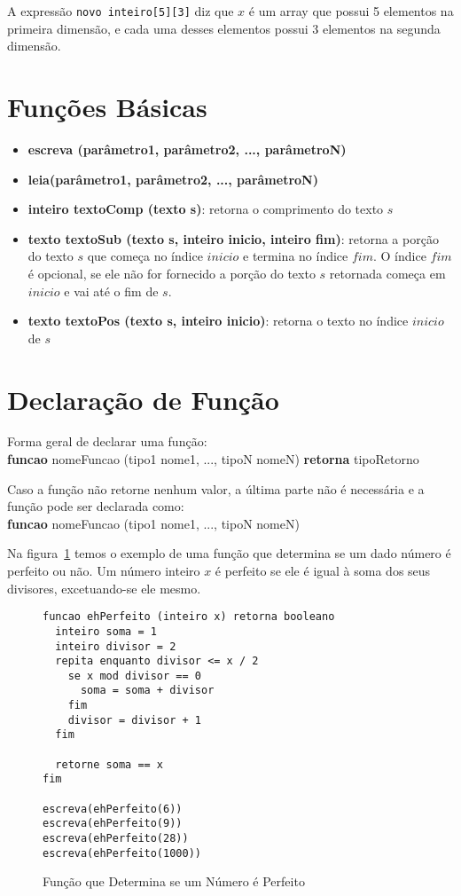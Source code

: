 \documentclass{report}
\begin{document}
A expressão \texttt{novo inteiro[5][3]} diz que $x$ é um
array que possui 5 elementos na primeira dimensão, e cada
uma desses elementos possui 3 elementos na segunda dimensão.


\section{Funções Básicas}

\begin{itemize}
	\item \textbf{escreva (parâmetro1, parâmetro2, ..., parâmetroN)}
	
	\item \textbf{leia(parâmetro1, parâmetro2, ..., parâmetroN)}
	
	\item \textbf{inteiro textoComp (texto s)}: retorna o comprimento do texto $s$
	
	\item \textbf{texto textoSub (texto s, inteiro inicio, inteiro fim)}:
	retorna a porção do texto $s$ que começa no índice $inicio$ e termina
  no índice $fim$. O índice $fim$ é opcional, se ele não for fornecido a
  porção do texto $s$ retornada começa em $inicio$ e vai até o fim de $s$.
	
	\item \textbf{texto textoPos (texto s, inteiro inicio)}:
	retorna o texto no índice $inicio$ de $s$
\end{itemize}


\section{Declaração de Função}

Forma geral de declarar uma função: \\
\textbf{funcao} nomeFuncao (tipo1 nome1, ..., tipoN nomeN) \textbf{retorna} tipoRetorno

Caso a função não retorne nenhum valor, a última parte não é necessária e a
função pode ser declarada como: \\
\textbf{funcao} nomeFuncao (tipo1 nome1, ..., tipoN nomeN)


Na figura~\ref{fig:perfeito} temos o exemplo de uma função que
determina se um dado número é perfeito ou não. Um número inteiro
$x$ é perfeito se ele é igual à soma dos seus divisores, excetuando-se
ele mesmo. 

\begin{figure}
\begin{verbatim}
funcao ehPerfeito (inteiro x) retorna booleano
  inteiro soma = 1
  inteiro divisor = 2
  repita enquanto divisor <= x / 2
    se x mod divisor == 0
      soma = soma + divisor
    fim
    divisor = divisor + 1
  fim	

  retorne soma == x
fim

escreva(ehPerfeito(6))
escreva(ehPerfeito(9))
escreva(ehPerfeito(28))
escreva(ehPerfeito(1000))
\end{verbatim}
\caption{Função que Determina se um Número é Perfeito}
\label{fig:perfeito}
\end{figure}
\end{document}
